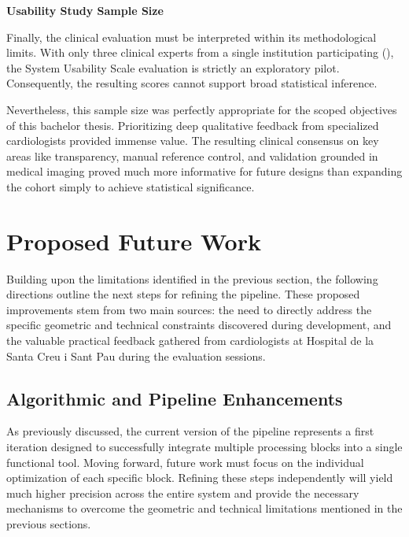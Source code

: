 \vspace{0.75em}
\noindent\textbf{Usability Study Sample Size}\par
\vspace{0.4em}
\noindent
Finally, the clinical evaluation must be interpreted within its methodological limits. With only three clinical experts from a single institution participating (), the System Usability Scale evaluation is strictly an exploratory pilot. Consequently, the resulting scores cannot support broad statistical inference.

Nevertheless, this sample size was perfectly appropriate for the scoped objectives of this bachelor thesis. Prioritizing deep qualitative feedback from specialized cardiologists provided immense value. The resulting clinical consensus on key areas like transparency, manual reference control, and validation grounded in medical imaging proved much more informative for future designs than expanding the cohort simply to achieve statistical significance.

\section{Proposed Future Work}
\label{sec:discussion-future}

Building upon the limitations identified in the previous section, the following directions outline the next steps for refining the pipeline. These proposed improvements stem from two main sources: the need to directly address the specific geometric and technical constraints discovered during development, and the valuable practical feedback gathered from cardiologists at Hospital de la Santa Creu i Sant Pau during the evaluation sessions.

\subsection{Algorithmic and Pipeline Enhancements}
\label{subsec:future-algorithmic}

As previously discussed, the current version of the pipeline represents a first iteration designed to successfully integrate multiple processing blocks into a single functional tool. Moving forward, future work must focus on the individual optimization of each specific block. Refining these steps independently will yield much higher precision across the entire system and provide the necessary mechanisms to overcome the geometric and technical limitations mentioned in the previous sections.

